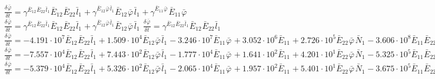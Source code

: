 $\frac{{\delta}^{} {\bar{\varphi}}_{}}{{\delta} {{{t}}_{}}^{}} = {\gamma}^{{{{\bar{E}}_{12}}^{}{{\bar{E}}_{22}}^{}{{\bar{l}}_{1}}^{}}}{{{\bar{E}}_{12}}^{}{{\bar{E}}_{22}}^{}{{\bar{l}}_{1}}^{}} + {\gamma}^{{{{\bar{E}}_{12}}^{}{{\bar{\varphi}}_{}}^{}{{\bar{l}}_{1}}^{}}}{{{\bar{E}}_{12}}^{}{{\bar{\varphi}}_{}}^{}{{\bar{l}}_{1}}^{}} + {\gamma}^{{{{\bar{E}}_{11}}^{}{{\bar{\varphi}}_{}}^{}}}{{{\bar{E}}_{11}}^{}{{\bar{\varphi}}_{}}^{}}$
$\frac{{\delta}^{} {\bar{\varphi}}_{}}{{\delta} {{{t}}_{}}^{}} = {\gamma}^{{{{\bar{E}}_{12}}^{}{{\bar{E}}_{22}}^{}{{\bar{l}}_{1}}^{}}}{{{\bar{E}}_{12}}^{}{{\bar{E}}_{22}}^{}{{\bar{l}}_{1}}^{}} + {\gamma}^{{{{\bar{E}}_{12}}^{}{{\bar{\varphi}}_{}}^{}{{\bar{l}}_{1}}^{}}}{{{\bar{E}}_{12}}^{}{{\bar{\varphi}}_{}}^{}{{\bar{l}}_{1}}^{}}$
$\frac{{\delta}^{} {\bar{\varphi}}_{}}{{\delta} {{{t}}_{}}^{}} = {\gamma}^{{{{\bar{E}}_{12}}^{}{{\bar{E}}_{22}}^{}{{\bar{l}}_{1}}^{}}}{{{\bar{E}}_{12}}^{}{{\bar{E}}_{22}}^{}{{\bar{l}}_{1}}^{}}$
$\frac{{\delta}^{} {\bar{\varphi}}_{}}{{\delta} {{{t}}_{}}^{}} = -4.191\cdot 10^{7}{{{\bar{E}}_{12}}^{}{{\bar{E}}_{22}}^{}{{\bar{l}}_{1}}^{}} + 1.509\cdot 10^{4}{{{\bar{E}}_{12}}^{}{{\bar{\varphi}}_{}}^{}{{\bar{l}}_{1}}^{}} - 3.246\cdot 10^{7}{{{\bar{E}}_{11}}^{}{{\bar{\varphi}}_{}}^{}} + 3.052\cdot 10^{6}{{{\bar{E}}_{11}}^{}} + 2.726\cdot 10^{5}{{{\bar{E}}_{22}}^{}{{\bar{\varphi}}_{}}^{}{{\bar{N}}_{1}}^{}} - 3.606\cdot 10^{8}{{{\bar{E}}_{11}}^{}{{\bar{E}}_{22}}^{}{{\bar{l}}_{1}}^{}} + 5.877\cdot 10^{6}{{{\bar{E}}_{22}}^{2}{{\bar{l}}_{1}}^{}} + 5.282\cdot 10^{6}{{{\bar{E}}_{11}}^{}{{\bar{\varphi}}_{}}^{}{{\bar{l}}_{1}}^{}} + 3.990\cdot 10^{5}{{{\bar{E}}_{11}}^{}{{\bar{\varphi}}_{}}^{}{{\bar{l}}_{2}}^{}} - 5.527\cdot 10^{7}{{{\bar{E}}_{22}}^{}{{\bar{\varphi}}_{}}^{}{{\bar{l}}_{2}}^{}}$
$\frac{{\delta}^{} {\bar{\varphi}}_{}}{{\delta} {{{t}}_{}}^{}} = -7.557\cdot 10^{4}{{{\bar{E}}_{12}}^{}{{\bar{E}}_{22}}^{}{{\bar{l}}_{1}}^{}} + 7.443\cdot 10^{2}{{{\bar{E}}_{12}}^{}{{\bar{\varphi}}_{}}^{}{{\bar{l}}_{1}}^{}} - 1.777\cdot 10^{4}{{{\bar{E}}_{11}}^{}{{\bar{\varphi}}_{}}^{}} + 1.641\cdot 10^{2}{{{\bar{E}}_{11}}^{}} + 4.201\cdot 10^{1}{{{\bar{E}}_{22}}^{}{{\bar{\varphi}}_{}}^{}{{\bar{N}}_{1}}^{}} - 5.325\cdot 10^{5}{{{\bar{E}}_{11}}^{}{{\bar{E}}_{22}}^{}{{\bar{l}}_{1}}^{}} + 5.135\cdot 10^{3}{{{\bar{E}}_{22}}^{2}{{\bar{l}}_{1}}^{}} + 1.740\cdot 10^{2}{{{\bar{E}}_{11}}^{}{{\bar{\varphi}}_{}}^{}{{\bar{l}}_{1}}^{}} + 4.727{{{\bar{E}}_{11}}^{}{{\bar{\varphi}}_{}}^{}{{\bar{l}}_{2}}^{}}$
$\frac{{\delta}^{} {\bar{\varphi}}_{}}{{\delta} {{{t}}_{}}^{}} = -5.379\cdot 10^{4}{{{\bar{E}}_{12}}^{}{{\bar{E}}_{22}}^{}{{\bar{l}}_{1}}^{}} + 5.326\cdot 10^{2}{{{\bar{E}}_{12}}^{}{{\bar{\varphi}}_{}}^{}{{\bar{l}}_{1}}^{}} - 2.065\cdot 10^{4}{{{\bar{E}}_{11}}^{}{{\bar{\varphi}}_{}}^{}} + 1.957\cdot 10^{2}{{{\bar{E}}_{11}}^{}} + 5.401\cdot 10^{1}{{{\bar{E}}_{22}}^{}{{\bar{\varphi}}_{}}^{}{{\bar{N}}_{1}}^{}} - 3.675\cdot 10^{5}{{{\bar{E}}_{11}}^{}{{\bar{E}}_{22}}^{}{{\bar{l}}_{1}}^{}} + 3.552\cdot 10^{3}{{{\bar{E}}_{22}}^{2}{{\bar{l}}_{1}}^{}} + 1.104\cdot 10^{2}{{{\bar{E}}_{11}}^{}{{\bar{\varphi}}_{}}^{}{{\bar{l}}_{1}}^{}}$
